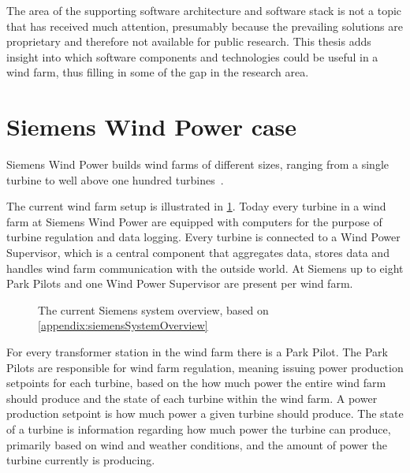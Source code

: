 The area of the supporting software architecture and software stack is not a topic that has received much attention, presumably because the prevailing solutions are proprietary and therefore not available for public research.
This thesis adds insight into which software components and technologies could be useful in a wind farm, thus filling in some of the gap in the research area.

\section{Siemens Wind Power case}


\label{sec:SiemensCase}
Siemens Wind Power builds wind farms of different sizes, ranging from a single turbine to well above one hundred turbines~\cite{simensOffShoreProjects, simensOnShoreProjects}. 

The current wind farm setup is illustrated in \cref{fig:currentSiemensSetup}. Today every turbine in a wind farm at Siemens Wind Power are equipped with computers for the purpose of turbine regulation and data logging. Every turbine is connected to a Wind Power Supervisor, which is a central component that aggregates data, stores data and handles wind farm communication with the outside world. At Siemens up to eight Park Pilots and one Wind Power Supervisor are present per wind farm.

\begin{figure}[!h]
	\centering
	\scalebox{0.7}{}
	\caption[The current Siemens wind farm system overview]{
		\label{fig:currentSiemensSetup} 
		\footnotesize{%
			The current Siemens system overview, based on \cref{appendix:siemensSystemOverview}
		}
	}
\end{figure}

For every transformer station in the wind farm there is a Park Pilot. The Park Pilots are responsible for wind farm regulation, meaning issuing power production setpoints for each turbine, based on the how much power the entire wind farm should produce and the state of each turbine within the wind farm. A power production setpoint is how much power a given turbine should produce. The state of a turbine is information regarding how much power the turbine can produce, primarily based on wind and weather conditions, and the amount of power the turbine currently is producing. 


